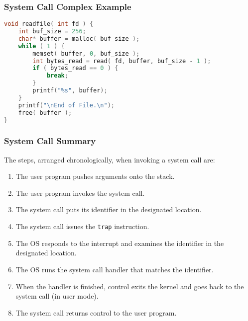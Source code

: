 \begin{frame}[fragile]
	\frametitle{System Call Complex Example}

	\begin{lstlisting}[language=C]
void readfile( int fd ) {
    int buf_size = 256;
    char* buffer = malloc( buf_size );
    while ( 1 ) {
        memset( buffer, 0, buf_size );
        int bytes_read = read( fd, buffer, buf_size - 1 );  
        if ( bytes_read == 0 ) {
            break; 
        }     
        printf("%s", buffer);
    }
    printf("\nEnd of File.\n");
    free( buffer );
}
\end{lstlisting}


\end{frame}


\begin{frame}
	\frametitle{System Call Summary}

	The steps, arranged chronologically, when invoking a system call are:
	\begin{enumerate}
		\item The user program pushes arguments onto the stack.
		\item The user program invokes the system call.
		\item The system call puts its identifier in the designated location.
		\item The system call issues the \texttt{trap} instruction.
		\item The OS responds to the interrupt and examines the identifier in the designated location.
		\item The OS runs the system call handler that matches the identifier.
		\item When the handler is finished, control exits the kernel and goes back to the system call (in user mode).
		\item The system call returns control to the user program.

	\end{enumerate}


\end{frame}







